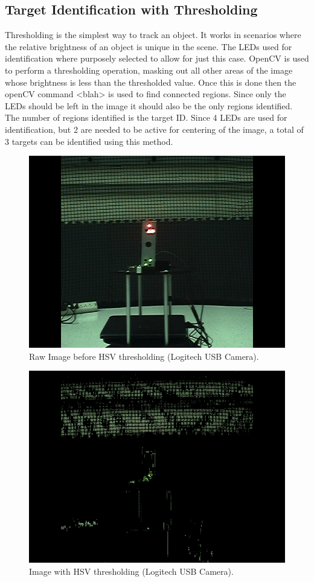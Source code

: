\documentclass[botnum, fleqn]{unmeethesis}
\begin{document}
\subsection*{Target Identification with Thresholding}
Thresholding is the simplest way to track an object. It works in scenarios where the relative brightness of an object is unique in the scene. The LEDs used for identification where purposely selected to allow for just this case. OpenCV is used to perform a thresholding operation, masking out all other areas of the image whose brightness is less than the thresholded value. Once this is done then the openCV command <blah> is used to find connected regions. Since only the LEDs should be left in the image it should also be the only regions identified. The number of regions identified is the target ID. Since 4 LEDs are used for identification, but 2 are needed to be active for centering of the image, a total of 3 targets can be identified using this method.

\clearpage

\begin{figure}[ht]
 \begin{center}
  \includegraphics[width=0.36 \textwidth]{figures/original.png}
  \caption{\small \label{fig:dot} Raw Image before HSV thresholding (Logitech USB Camera).}
 \end{center}
\end{figure}

\begin{figure}[htb]
 \begin{center}
  \includegraphics[width=0.36 \textwidth]{figures/hsvmasked.png}
  \caption{\small \label{fig:dot} Image with HSV thresholding (Logitech USB Camera).}
 \end{center}
\end{figure}
\end{document}

